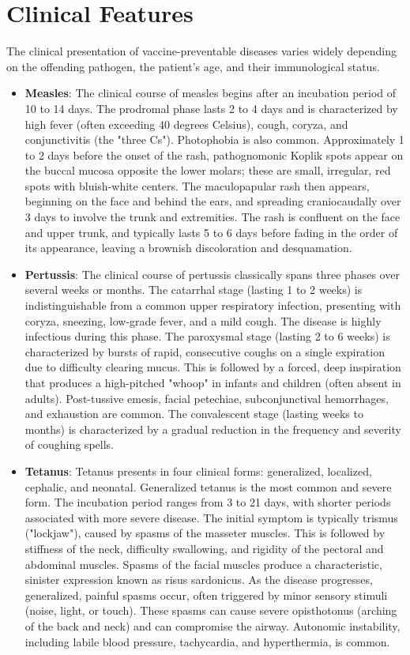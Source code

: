 \section*{Clinical Features}
The clinical presentation of vaccine-preventable diseases varies widely depending on the offending pathogen, the patient's age, and their immunological status.
\begin{itemize}
    \item \textbf{Measles}: The clinical course of measles begins after an incubation period of 10 to 14 days. The prodromal phase lasts 2 to 4 days and is characterized by high fever (often exceeding 40 degrees Celsius), cough, coryza, and conjunctivitis (the "three Cs"). Photophobia is also common. Approximately 1 to 2 days before the onset of the rash, pathognomonic Koplik spots appear on the buccal mucosa opposite the lower molars; these are small, irregular, red spots with bluish-white centers. The maculopapular rash then appears, beginning on the face and behind the ears, and spreading craniocaudally over 3 days to involve the trunk and extremities. The rash is confluent on the face and upper trunk, and typically lasts 5 to 6 days before fading in the order of its appearance, leaving a brownish discoloration and desquamation.
    \item \textbf{Pertussis}: The clinical course of pertussis classically spans three phases over several weeks or months. The catarrhal stage (lasting 1 to 2 weeks) is indistinguishable from a common upper respiratory infection, presenting with coryza, sneezing, low-grade fever, and a mild cough. The disease is highly infectious during this phase. The paroxysmal stage (lasting 2 to 6 weeks) is characterized by bursts of rapid, consecutive coughs on a single expiration due to difficulty clearing mucus. This is followed by a forced, deep inspiration that produces a high-pitched "whoop" in infants and children (often absent in adults). Post-tussive emesis, facial petechiae, subconjunctival hemorrhages, and exhaustion are common. The convalescent stage (lasting weeks to months) is characterized by a gradual reduction in the frequency and severity of coughing spells.
    \item \textbf{Tetanus}: Tetanus presents in four clinical forms: generalized, localized, cephalic, and neonatal. Generalized tetanus is the most common and severe form. The incubation period ranges from 3 to 21 days, with shorter periods associated with more severe disease. The initial symptom is typically trismus ("lockjaw"), caused by spasms of the masseter muscles. This is followed by stiffness of the neck, difficulty swallowing, and rigidity of the pectoral and abdominal muscles. Spasms of the facial muscles produce a characteristic, sinister expression known as risus sardonicus. As the disease progresses, generalized, painful spasms occur, often triggered by minor sensory stimuli (noise, light, or touch). These spasms can cause severe opisthotonus (arching of the back and neck) and can compromise the airway. Autonomic instability, including labile blood pressure, tachycardia, and hyperthermia, is common.

\end{itemize}
